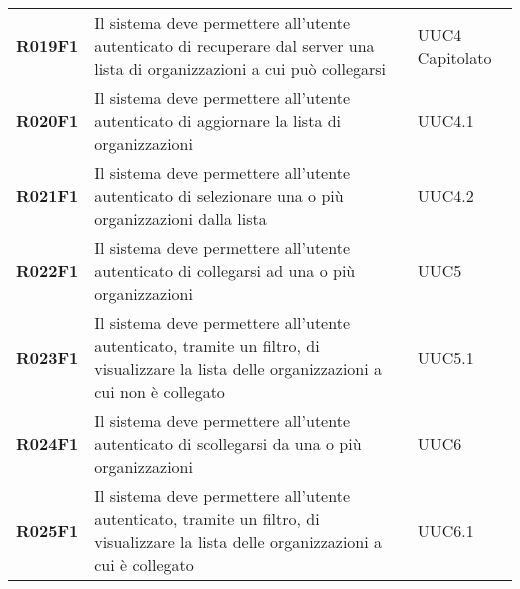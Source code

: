 \documentclass[../analisi-dei-requisiti.tex]{subfiles}
\begin{document}
\begin{longtable}[H]{>{\centering\bfseries}m{3cm} >{\centering}m{10cm} >{\centering\arraybackslash}m{3cm}}
  R019F1                  & Il sistema deve permettere all'utente autenticato di recuperare dal server una lista di organizzazioni a cui può collegarsi                                                        & UUC4 Capitolato               \\
  R020F1                  & Il sistema deve permettere all'utente autenticato di aggiornare la lista di organizzazioni                                                                                         & UUC4.1                        \\
  R021F1                  & Il sistema deve permettere all'utente autenticato di selezionare una o più organizzazioni dalla lista                                                                              & UUC4.2                        \\
  R022F1                  & Il sistema deve permettere all'utente autenticato di collegarsi ad una o più organizzazioni                                                                                        & UUC5                          \\
  R023F1                  & Il sistema deve permettere all'utente autenticato, tramite un filtro, di visualizzare la lista delle organizzazioni a cui non è collegato                                          & UUC5.1                        \\
  R024F1                  & Il sistema deve permettere all'utente autenticato di scollegarsi da una o più organizzazioni                                                                                       & UUC6                          \\
  R025F1                  & Il sistema deve permettere all'utente autenticato, tramite un filtro, di visualizzare la lista delle organizzazioni a cui è collegato                                              & UUC6.1                        \\


\end{longtable}
\end{document}
